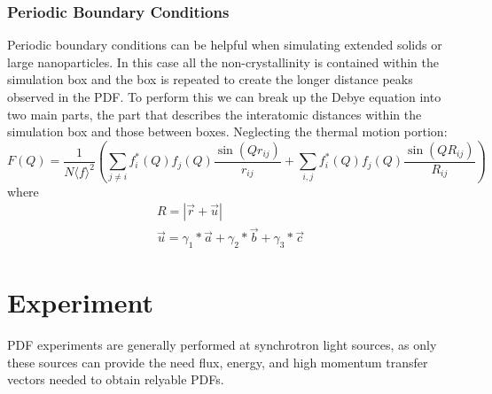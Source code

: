 \subsubsection{Periodic Boundary Conditions}
Periodic boundary conditions can be helpful when simulating extended solids or large nanoparticles. In this case all the non-crystallinity is contained within the simulation box and the box is repeated to create the longer distance peaks observed in the PDF. To perform this we can break up the Debye equation into two main parts, the part that describes the interatomic distances within the simulation box and those between boxes. Neglecting the thermal motion portion:
\begin{equation}
  F(Q) = \frac{1}{N \langle f \rangle^{2}}(\sum_{j\neq i} f_i^{*}(Q)f_j(Q) \frac{\sin(Qr_{ij})}{r_{ij}} + \sum_{i,j} f_i^{*}(Q)f_j(Q) \frac{\sin(QR_{ij})}{R_{ij}})
\end{equation}
where 
\begin{eqnarray}
  R = |\vec{r} + \vec{u}|\\
  \vec{u} = \gamma_1*\vec{a} + \gamma_2*\vec{b} + \gamma_3*\vec{c}
\end{eqnarray}
\section{Experiment}
PDF experiments are generally performed at synchrotron light sources, as only these sources can provide the need flux, energy, and high momentum transfer vectors needed to obtain relyable PDFs.


